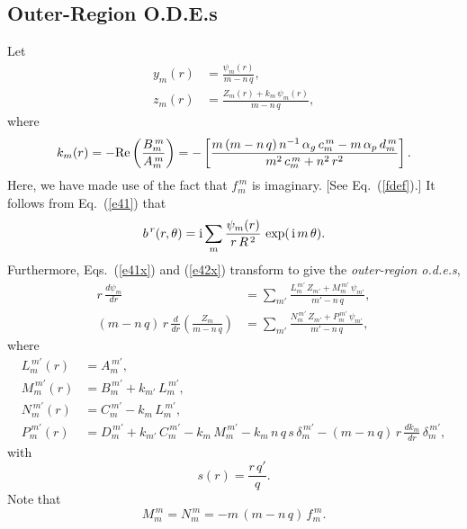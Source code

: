 \documentclass[12pt,prb,aps]{revtex4-1}
\begin{document}
\subsection{Outer-Region O.D.E.s}\label{ode2}
Let 
\begin{align}
y_m(r) &= \frac{\psi_m(r)}{m-n\,q},\label{e115}\\[0.5ex]
z_m(r) &= \frac{Z_m(r)+k_m\,\psi_m(r)}{m-n\,q},\label{Zdef}
\end{align}
where
\begin{equation}\label{e117}
k_m(r) = -{\rm Re}\left(\frac{B_m^{\,m}}{A_m^{\,m}}\right) = -\left[\frac{m\,(m-n\,q)\,
n^{-1}\,\alpha_g\,c_m^{\,m} - m\,\alpha_p\,d_m^{\,m}}{m^2\,c_m^{\,m}+n^2\,r^2}\right].
\end{equation}
Here, we have made use of the fact that $f_m^{\,m}$ is imaginary. [See Eq.~(\ref{fdef}).] 
It follows from Eq.~(\ref{e41}) that
\begin{equation}\label{psidef}
b^{\,r}(r,\theta)= {\rm i}\sum_{m}\frac{\psi_m(r)}{r\,R^{\,2}}\,\exp(\,{\rm i}\,m\,\theta). 
\end{equation}
Furthermore, Eqs.~(\ref{e41x}) and (\ref{e42x}) transform to give the  {\em outer-region o.d.e.s},\cite{am1,am3}
\begin{align}\label{e61x}
r\,\frac{d\psi_m}{dr} &=\sum_{m'}\frac{L_m^{\,m'}\,Z_{m'}+M_m^{\,m'}\,\psi_{m'}}{m'-n\,q},\\[0.5ex]
(m-n\,q)\,r\,\frac{d}{dr}\!\left(\frac{Z_m}{m-n\,q}\right)&=\sum_{m'}\frac{N_m^{\,m'}\,Z_{m'}+P_m^{\,m'}\,\psi_{m'}}{m'-n\,q},\label{e62x}
\end{align}
where
\begin{align}\label{e121}
L_m^{\,m'}(r) &=A_m^{\,m'},\\[0.5ex]
M_m^{\,m'}(r)& = B_m^{\,m'}+k_{m'}\,L_m^{\,m'},\\[0.5ex]
N_m^{\,m'}(r)&= C_m^{\,m'}-k_m\,L_m^{\,m'},\\[0.5ex]
P_m^{\,m'}(r) &=D_m^{\,m'}+k_{m'}\,C_m^{\,m'}  -k_m\,M_m^{\,m'}-k_m\,n\,q\,s\,\delta_m^{\,m'} - (m-n\,q)\,r\,\frac{dk_{m}}{dr}\,\delta_m^{\,m'},\label{e124}
\end{align}
with 
\begin{equation}
s(r)=\frac{r\,q'}{q}.
\end{equation}
Note that
\begin{equation}
M_m^{\,m}=N_m^{\,m} = - m\,(m-n\,q)\,f_m^{\,m}.
\end{equation}
\end{document}

